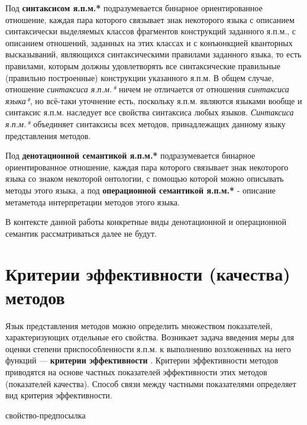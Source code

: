 Под \textbf{синтаксисом я.п.м.*} подразумевается бинарное ориентированное отношение, каждая пара которого связывает знак некоторого языка с описанием синтаксически выделяемых классов фрагментов конструкций заданного я.п.м., с описанием отношений, заданных на этих классах и с конъюнкцией кванторных высказываний, являющихся синтаксическими правилами заданного языка, то есть правилами, которым должны удовлетворять все синтаксические правильные (правильно построенные) конструкции указанного я.п.м. В общем случае, отношение \textit{синтаксиса я.п.м.*} ничем не отличается от отношения \textit{синтаксиса языка*}, но всё-таки уточнение есть, поскольку я.п.м. являются языками вообще и синтаксис я.п.м. наследует все свойства синтаксиса любых языков. \textit{Синтаксиса я.п.м.*} объединяет синтаксисы всех методов, принадлежащих данному языку представления методов.

Под \textbf{денотационной семантикой я.п.м.*} подразумевается бинарное ориентированное отношение, каждая пара которого связывает знак некоторого языка со знаком некоторой онтологии, с помощью которой можно описывать методы этого языка, а под \textbf{операционной семантикой я.п.м.*} - описание метаметода интерпретации методов этого языка.

В контексте данной работы конкретные виды денотационной и операционной семантик рассматриваться далее не будут.

\section{Критерии эффективности (качества) методов}

Язык представления методов можно определить множеством показателей, характеризующих отдельные его свойства. Возникает задача введения меры для оценки степени приспособленности я.п.м. к выполнению возложенных на него функций — \textbf{критерии эффективности} \cite{Orlov2013}. Критерии эффективности методов приводятся на основе частных показателей эффективности этих методов (показателей качества). Способ связи между частными показателями определяет вид критерия эффективности.

\begin{SCn}
\begin{scnrelfromlist}{свойство-предпосылка}
\end{scnrelfromlist}
\end{SCn}

